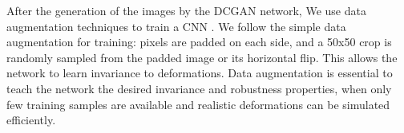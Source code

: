After the generation of the images by the DCGAN network, We use  data augmentation techniques to train a CNN . We follow the simple data augmentation for training: pixels are padded on each side, and a 50x50 crop is randomly sampled from the padded image or its horizontal flip.  This allows the network to learn invariance to deformations. Data augmentation is essential to teach the network the desired invariance and robustness properties, when only few training samples are available and realistic deformations can be simulated efficiently.


\begin{figure}[htp]
  \label{fig:threshold}
  \centering
\end{figure}

